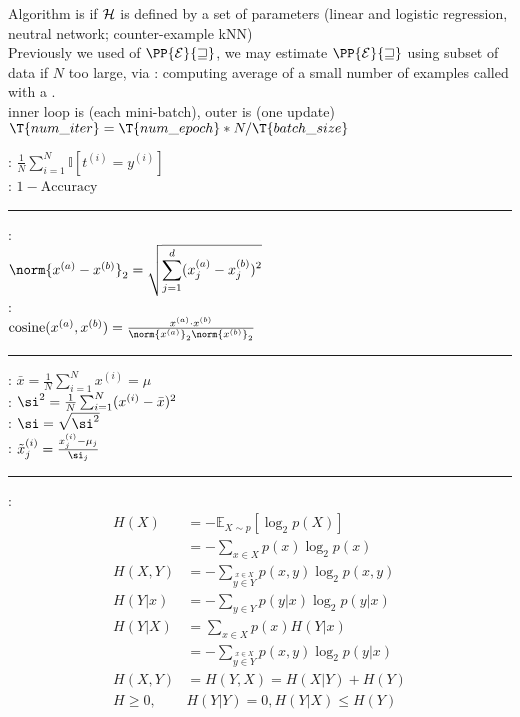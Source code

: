 \documentclass[10pt]{CheatSheet/hw}
\begin{document}
\begin{multicols*}{5}
Algorithm is  if $\cal{H}$ is defined by a set of parameters (linear and logistic regression, neutral network; counter-example kNN)\\
Previously we used  of $\PP{\cal{E}}{w}$, we may estimate $\PP{\cal{E}}{w}$ using subset of data if $N$ too large, via : computing average of a small number of examples called  with a .\\
inner loop is  (each mini-batch), outer is  (one update)\\
$\T{num\_iter}=\T{num\_epoch}* N / \T{batch\_size}$

\columnbreak
{}: $\frac1N\sum_{i=1}^N \mathbb{I}[t^{(i)} = y^{(i)}]$\\
: $1 - \text{Accuracy}$\\
\rule{\linewidth}{0.4pt}
:\\ $\norm{x^{(a)}-x^{(b)}}_2 = \sqrt{\displaystyle\sum_{j=1}^d(x_j^{(a)}-x_j^{(b)})^2}$\\
:\\
$\operatorname{cosine}(x^{(a)}, x^{(b)}) = \frac{x^{(a)}\cdot x^{(b)}}{\norm{x^{(a)}}_2\norm{x^{(b)}}_2}$\\
\rule{\linewidth}{0.4pt}
: $\bar{x}=\frac1N\sum_{i=1}^Nx^{(i)}=\mu$\\
: $\si^2=\frac1N\sum_{i=1}^N(x^{(i)}-\bar{x})^2$\\
: $\si=\sqrt{\si^2}$\\
: $\tilde{x}^{(i)}_j=\frac{x^{(i)}_j-\mu_j}{\si_j}$\\
\rule{\linewidth}{0.4pt}
:
\begin{align*}
    H(X)&=-\mathbb{E}_{X\sim p}[\log_2 p(X)]\\
    &=-\textstyle\sum_{x\in X}p(x)\log_2p(x)\\
    H(X,Y) &= - \textstyle\sum_{\stackrel{x\in X}{y\in Y}}p(x,y)\log_2p(x,y)\\
    H(Y | x) &= - \textstyle\sum_{y\in Y}p(y|x)\log_2p(y|x)\\
    H(Y|X) &= \textstyle\sum_{x\in X}p(x) H(Y|x)\\
    &= - \textstyle\sum_{\stackrel{x\in X}{y\in Y}}p(x,y)\log_2p(y|x)\\
    H(X,Y)&=H(Y,X)=H(X|Y)+H(Y)\\
    H \ge 0, &H(Y|Y)=0, H(Y|X)\le H(Y)\\

\end{align*}
\end{multicols*}
\end{document}

